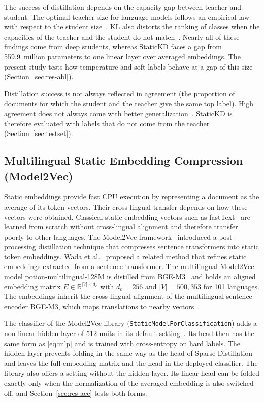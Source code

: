 \documentclass{ieeeaccess}
\begin{document}
The success of distillation depends on the capacity gap between teacher and student. The optimal teacher size for language models follows an empirical law with respect to the student size~\cite{zhang2025law}. KL also distorts the ranking of classes when the capacities of the teacher and the student do not match~\cite{wang2026rckd}. Nearly all of these findings come from deep students, whereas StaticKD faces a gap from 559.9~million parameters to one linear layer over averaged embeddings. The present study tests how temperature and soft labels behave at a gap of this size (Section~\ref{sec:res-abl}).

Distillation success is not always reflected in agreement (the proportion of documents for which the student and the teacher give the same top label). High agreement does not always come with better generalization~\cite{stanton2021kd}. StaticKD is therefore evaluated with labels that do not come from the teacher (Section~\ref{sec:testset}).

\subsection{Multilingual Static Embedding Compression (Model2Vec)}
\label{sec:rw-static}
Static embeddings provide fast CPU execution by representing a document as the average of its token vectors. Their cross-lingual transfer depends on how these vectors were obtained. Classical static embedding vectors such as fastText~\cite{joulin2017bag} are learned from scratch without cross-lingual alignment and therefore transfer poorly to other languages. The Model2Vec framework~\cite{tulkens2024model2vec} introduced a post-processing distillation technique that compresses sentence transformers into static token embeddings. Wada et al.~\cite{wada2025static} proposed a related method that refines static embeddings extracted from a sentence transformer. The multilingual Model2Vec model potion-multilingual-128M is distilled from BGE-M3~\cite{chen2024bgem3} and holds an aligned embedding matrix $E\in\mathbb{R}^{|V|\times d_e}$ with $d_e=256$ and $|V|=500{,}353$ for 101 languages. The embeddings inherit the cross-lingual alignment of the multilingual sentence encoder BGE-M3, which maps translations to nearby vectors~\cite{chen2024bgem3}.

The classifier of the Model2Vec library (\texttt{StaticModelForClassification}) adds a non-linear hidden layer of 512 units in its default setting~\cite{tulkens2024model2vec}. Its head then has the same form as \eqref{eq:mlp} and is trained with cross-entropy on hard labels. The hidden layer prevents folding in the same way as the head of Sparse Distillation and leaves the full embedding matrix and the head in the deployed classifier. The library also offers a setting without the hidden layer. Its linear head can be folded exactly only when the normalization of the averaged embedding is also switched off, and Section~\ref{sec:res-acc} tests both forms.
\end{document}

